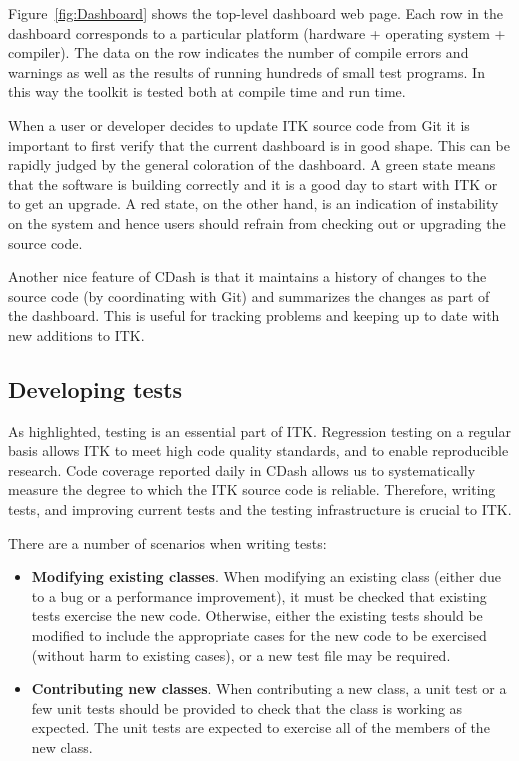 Figure~\ref{fig:Dashboard} shows the top-level dashboard web page. Each row
in the dashboard corresponds to a particular platform (hardware + operating
system + compiler). The data on the row indicates the number of compile
errors and warnings as well as the results of running hundreds of
small test programs. In this way the toolkit is tested both at compile time
and run time.

When a user or developer decides to update ITK source code from Git it is
important to first verify that the current dashboard is in good shape. This
can be rapidly judged by the general coloration of the dashboard. A green
state means that the software is building correctly and it is a good day to
start with ITK or to get an upgrade. A red state, on the other hand, is an
indication of instability on the system and hence users should refrain from
checking out or upgrading the source code.

Another nice feature of CDash is that it maintains a history of changes to the
source code (by coordinating with Git) and summarizes the changes as part of
the dashboard. This is useful for tracking problems and keeping up to date
with new additions to ITK.

\subsection{Developing tests}
\label{subsec:developingTests}

As highlighted, testing is an essential part of ITK. Regression testing on a
regular basis allows ITK to meet high code quality standards, and to enable
reproducible research. Code coverage reported daily in CDash allows us to
systematically measure the degree to which the ITK source code is reliable.
Therefore, writing tests, and improving current tests and the testing
infrastructure is crucial to ITK.

There are a number of scenarios when writing tests:
\begin{itemize}
\item \textbf{Modifying existing classes}. When modifying an existing class
(either due to a bug or a performance improvement), it must be checked that
existing tests exercise the new code. Otherwise, either the existing tests
should be modified to include the appropriate cases for the new code to be
exercised (without harm to existing cases), or a new test file may be required.
\item \textbf{Contributing new classes}. When contributing a new class, a unit
test or a few unit tests should be provided to check that the class is working
as expected. The unit tests are expected to exercise all of the members of the
new class.
\end{itemize}

